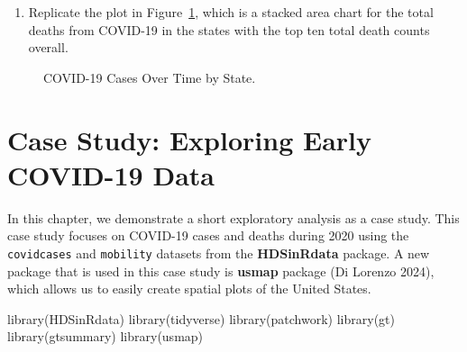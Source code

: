 \documentclass[
  letterpaper,
]{latex/krantz}
\makeatletter
\newenvironment{Shaded}{\begin{snugshade}}{\end{snugshade}}
\newcommand{\FunctionTok}[1]{\textcolor[rgb]{0.28,0.35,0.67}{#1}}
\newcommand{\NormalTok}[1]{\textcolor[rgb]{0.00,0.23,0.31}{#1}}
\providecommand{\tightlist}{%
  \setlength{\itemsep}{0pt}\setlength{\parskip}{0pt}}\usepackage{longtable,booktabs,array}
\newenvironment{kframe}{%
\medskip{}
\setlength{\fboxsep}{.8em}
 \def\at@end@of@kframe{}%
 \ifinner\ifhmode%
  \def\at@end@of@kframe{\end{minipage}}%
  \begin{minipage}{\columnwidth}%
 \fi\fi%
 \def\FrameCommand##1{\hskip\@totalleftmargin \hskip-\fboxsep
 \colorbox{shadecolor}{##1}\hskip-\fboxsep
     \hskip-\linewidth \hskip-\@totalleftmargin \hskip\columnwidth}%
 \MakeFramed {\advance\hsize-\width
   \@totalleftmargin\z@ \linewidth\hsize
   \@setminipage}}%
 {\par\unskip\endMakeFramed%
 \at@end@of@kframe}
\renewenvironment{Shaded}{\begin{kframe}}{\end{kframe}}
\makeatother
\begin{document}
\begin{enumerate}
\def\labelenumi{\arabic{enumi}.}
\setcounter{enumi}{1}
\tightlist
\item
  Replicate the plot in Figure~\ref{fig-covid-area-chart}, which is a
  stacked area chart for the total deaths from COVID-19 in the states
  with the top ten total death counts overall.
\end{enumerate}

\begin{figure}


\caption{\label{fig-covid-area-chart}COVID-19 Cases Over Time by State.}

\end{figure}%

\chapter{Case Study: Exploring Early COVID-19 Data}\label{sec-cs-eda}

In this chapter, we demonstrate a short exploratory analysis as a case
study. This case study focuses on
COVID-19 cases and deaths during 2020 using the
\texttt{covidcases} and
\texttt{mobility} datasets
from the \textbf{HDSinRdata} package. A new
package that is used in this case study is
\textbf{usmap} package (Di Lorenzo 2024), which
allows us to easily create spatial plots of the United States.

\begin{Shaded}
\begin{Highlighting}[]
\FunctionTok{library}\NormalTok{(HDSinRdata)}
\FunctionTok{library}\NormalTok{(tidyverse)}
\FunctionTok{library}\NormalTok{(patchwork)}
\FunctionTok{library}\NormalTok{(gt)}
\FunctionTok{library}\NormalTok{(gtsummary)}
\FunctionTok{library}\NormalTok{(usmap)}
\end{Highlighting}
\end{Shaded}
\end{document}
